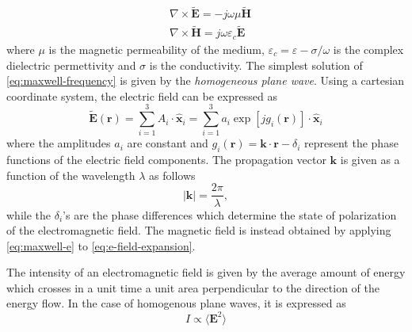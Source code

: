 \begin{subequations}\label{eq:maxwell-frequency}
\begin{align}
& \nabla \times \widetilde{\textbf{E}} = -j\omega\mu\widetilde{\textbf{H}} \label{eq:maxwell-e}\\
& \nabla \times \widetilde{\textbf{H}} = j\omega\varepsilon_c\widetilde{\textbf{E}}\label{eq:maxwell-h}
\end{align}
\end{subequations}
where $\mu$ is the magnetic permeability of the medium, $\varepsilon_c = \varepsilon - \sigma/\omega$ is the complex dielectric permettivity and $\sigma$ is the conductivity. The simplest solution of \autoref{eq:maxwell-frequency} is given by the \emph{homogeneous plane wave}. Using a cartesian coordinate system, the electric field can be expressed as
\begin{equation}\label{eq:e-field-expansion}
		\widetilde{\textbf{E}}(\textbf{r}) = \sum_{i=1}^3 A_i \cdot \hat{\textbf{x}}_i  = \sum_{i=1}^3 a_i \exp\left[jg_i(\textbf{r})\right]  \cdot \hat{\textbf{x}}_i
\end{equation}
where the amplitudes $a_i$ are constant and $g_i(\textbf{r}) = \textbf{k}\cdot\textbf{r} - \delta_i$ represent the phase functions of the electric field components. The propagation vector $\textbf{k}$ is given as a function of the wavelength $\lambda$ as follows
\begin{equation}
	|\textbf{k}| = \frac{2\pi}{\lambda},
\end{equation}
while the $\delta_i$'s are the phase differences which determine the state of polarization of the electromagnetic field. The magnetic field is instead obtained by applying \autoref{eq:maxwell-e} to \autoref{eq:e-field-expansion}. 

The intensity of an electromagnetic field is given by the average amount of energy which crosses in a unit time a unit area perpendicular to the direction of the energy flow. In the case of homogenous plane waves, it is expressed as
\begin{equation}\label{eq:intensity}
	I \propto \langle \textbf{E}^2 \rangle
\end{equation}

